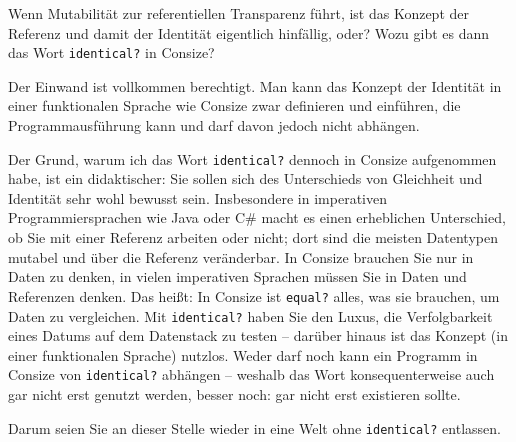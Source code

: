 Wenn Mutabilität zur referentiellen Transparenz führt, ist das Konzept der Referenz und damit der Identität eigentlich hinfällig, oder? Wozu gibt es dann das Wort \verb|identical?| in Consize?

Der Einwand ist vollkommen berechtigt. Man kann das Konzept der Identität in einer funktionalen Sprache wie Consize zwar definieren und einführen, die Programmausführung kann und darf davon jedoch nicht abhängen.

Der Grund, warum ich das Wort \verb|identical?| dennoch in Consize aufgenommen habe, ist ein didaktischer: Sie sollen sich des Unterschieds von Gleichheit und Identität sehr wohl bewusst sein. Insbesondere in imperativen Programmiersprachen wie Java oder C\# macht es einen erheblichen Unterschied, ob Sie mit einer Referenz arbeiten oder nicht; dort sind die meisten Datentypen mutabel und über die Referenz veränderbar. In Consize brauchen Sie nur in Daten zu denken, in vielen imperativen Sprachen müssen Sie in Daten und Referenzen denken. Das heißt: In Consize ist \verb|equal?| alles, was sie brauchen, um Daten zu vergleichen. Mit \verb|identical?| haben Sie den Luxus, die Verfolgbarkeit eines Datums auf dem Datenstack zu testen -- darüber hinaus ist das Konzept (in einer funktionalen Sprache) nutzlos. Weder darf noch kann ein Programm in Consize von \verb|identical?| abhängen -- weshalb das Wort konsequenterweise auch gar nicht erst genutzt werden, besser noch: gar nicht erst existieren sollte.

Darum seien Sie an dieser Stelle wieder in eine Welt ohne \verb|identical?| entlassen.